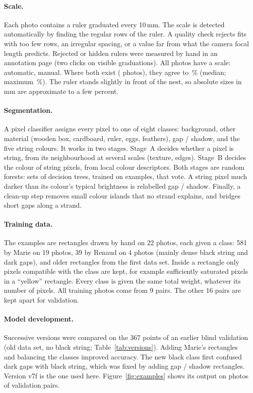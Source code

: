 \documentclass[11pt,a4paper]{article}
\begin{document}
\paragraph{Scale.} Each photo contains a ruler graduated every 10\,mm. The scale is detected
automatically by finding the regular rows of the ruler. A quality check rejects fits with too few
rows, an irregular spacing, or a value far from what the camera focal length predicts. Rejected or
hidden rulers were measured by hand in an annotation page (two clicks on visible graduations).
All \nphotos{} photos have a scale: \nauto{} automatic, \nmanual{} manual. Where both exist
(\scaleboth{} photos), they agree to \scaledev\,\% (median; maximum \scaledevmax\,\%). The ruler stands
slightly in front of the nest, so absolute sizes in mm are approximate to a few percent.

\paragraph{Segmentation.} A pixel classifier assigns every pixel to one of eight classes:
background, other material (wooden box, cardboard, ruler, eggs, feathers), gap / shadow, and the five
string colours. It works in two stages. Stage~A decides whether a pixel is string, from its
neighbourhood at several scales (texture, edges). Stage~B decides the colour of string pixels, from
local colour descriptors. Both stages are random forests: sets of decision trees, trained on examples,
that vote. A string pixel much darker than its colour's typical brightness is relabelled gap /
shadow. Finally, a clean-up step removes small colour islands that no strand explains, and bridges
short gaps along a strand.

\paragraph{Training data.} The examples are rectangles drawn by hand on 22 photos, each given a class:
581 by Marie on 19 photos, 39 by Renaud on 4 photos (mainly dense black string and dark gaps), and older
rectangles from the first data set. Inside a rectangle only pixels compatible with the class are kept,
for example sufficiently saturated pixels in a ``yellow'' rectangle. Every class is given the same
total weight, whatever its number of pixels. All training photos come from 9 pairs. The other 16 pairs
are kept apart for validation.

\paragraph{Model development.} Successive versions were compared on the 367 points of an earlier blind
validation (old data set, no black string; Table~\ref{tab:versions}). Adding Marie's rectangles and
balancing the classes improved accuracy. The new black class first confused dark gaps with black
string, which was fixed by adding gap / shadow rectangles. Version v7f is the one used here.
Figure~\ref{fig:examples} shows its output on photos of validation pairs.
\end{document}
